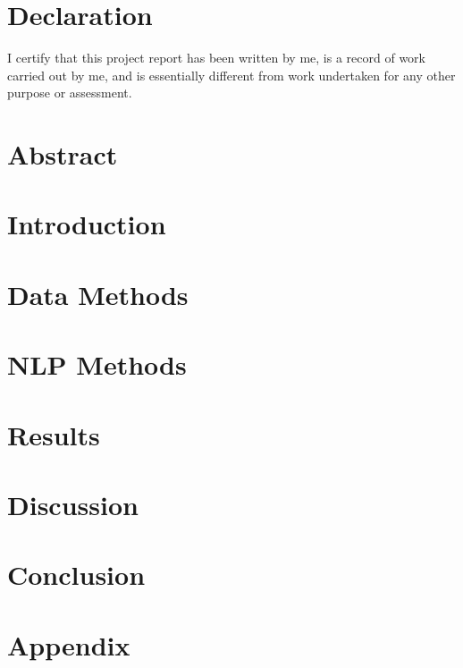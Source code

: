 \documentclass[]{report}
\newcommand\blankpage{%
    \null
    \thispagestyle{empty}%
    \addtocounter{page}{-1}%
    \newpage}
\begin{document}

\tableofcontents
\afterpage{\blankpage}


\chapter*{Declaration}
I certify that this project report has been written by me, is a record of work carried out by me, and is essentially different from work undertaken for any other purpose or assessment.

\chapter*{Abstract}


\chapter{Introduction} %

 
\chapter{Data Methods} %


 
\chapter{NLP Methods} \label{methods}%



 
\chapter{Results} %


 
\chapter{Discussion} %


 
\chapter{Conclusion} %



%


\appendix
\chapter{Appendix}
\end{document}
